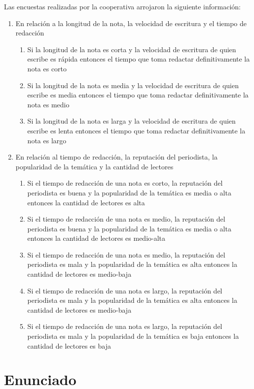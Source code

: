 \documentclass{article}
\begin{document}
\begin{itemize}
Las encuestas realizadas por la cooperativa arrojaron la siguiente información:

\begin{enumerate}
	\item En relación a la longitud de la nota, la velocidad de escritura y el tiempo de redacción
		\begin{enumerate}
			\item Si la longitud de la nota es corta y la velocidad de escritura de quien escribe es rápida entonces el tiempo que toma redactar definitivamente la nota es corto
			\item Si la longitud de la nota es media y la velocidad de escritura de quien escribe es media entonces el tiempo que toma redactar definitivamente la nota es medio
			\item Si la longitud de la nota es larga y la velocidad de escritura de quien escribe es lenta entonces el tiempo que toma redactar definitivamente la nota es largo
		\end{enumerate}
	\item En relación al tiempo de redacción, la reputación del periodista, la popularidad de la temática y la cantidad de lectores
		\begin{enumerate}
			\item Si el tiempo de redacción de una nota es corto, la reputación del periodista es buena y la popularidad de la temática es media o alta entonces la cantidad de lectores es alta
			\item Si el tiempo de redacción de una nota es medio, la reputación del periodista es buena y la popularidad de la temática es media o alta entonces la cantidad de lectores es medio-alta
			\item Si el tiempo de redacción de una nota es medio, la reputación del periodista es mala y la popularidad de la temática es alta entonces la cantidad de lectores es medio-baja
			\item Si el tiempo de redacción de una nota es largo, la reputación del periodista es mala y la popularidad de la temática es alta entonces la cantidad de lectores es medio-baja
			\item Si el tiempo de redacción de una nota es largo, la reputación del periodista es mala y la popularidad de la temática es baja entonces la cantidad de lectores es baja
		\end{enumerate}
\end{enumerate}

\section*{Enunciado}


\end{itemize}
\end{document}
